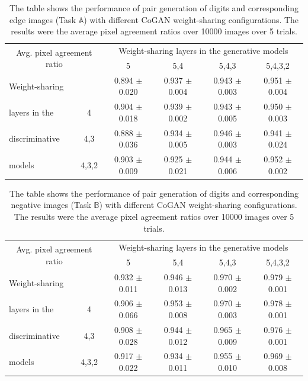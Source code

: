 \begin{table}[thb!]
\centering
{
\caption{The table shows the performance of pair generation of digits and corresponding edge images (Task $\mathbb{A}$) with different CoGAN weight-sharing configurations. The results were the average pixel agreement ratios over 10000 images over 5 trials.}
\label{tbl::weight_sharing_analysis_A} 
\begin{tabular}{lc|cccc}
\hline
\multicolumn{2}{c|}{\multirow{2}{*}{Avg. pixel agreement ratio}} & \multicolumn{4}{c}{Weight-sharing layers in the generative models}\\
\multicolumn{2}{c|}{}   & 5 & 5,4 & 5,4,3 & 5,4,3,2\\
\hline
Weight-sharing &       & 0.894 $\pm$ 0.020	& 0.937 $\pm$ 0.004 &	0.943 $\pm$ 0.003 &	0.951 $\pm$ 0.004 \\
layers in the  & 4     & 0.904 $\pm$	0.018 & 0.939 $\pm$ 0.002 &	0.943 $\pm$ 0.005 &	0.950 $\pm$ 0.003 \\
discriminative & 4,3   & 0.888 $\pm$	0.036 & 0.934 $\pm$ 0.005 &	0.946 $\pm$ 0.003 &	0.941 $\pm$ 0.024 \\
models         & 4,3,2 & 0.903 $\pm$ 0.009 &	0.925 $\pm$ 0.021 &	0.944 $\pm$ 0.006 &	0.952 $\pm$ 0.002 \\
\hline
\end{tabular}}
\end{table}

\begin{table}[thb!]
\centering
{
\caption{The table shows the performance of pair generation of digits and corresponding negative images (Task $\mathbb{B}$) with different CoGAN weight-sharing configurations. The results were the average pixel agreement ratios over 10000 images over 5 trials.}
\label{tbl::weight_sharing_analysis_B} 
\begin{tabular}{lc|cccc}
\hline
\multicolumn{2}{c|}{\multirow{2}{*}{Avg. pixel agreement ratio}} & \multicolumn{4}{c}{Weight-sharing layers in the generative models}\\
\multicolumn{2}{c|}{}   & 5 & 5,4 & 5,4,3 & 5,4,3,2\\
\hline
Weight-sharing &       & 0.932 $\pm$ 0.011 & 0.946 $\pm$ 0.013 &	0.970 $\pm$ 0.002 &	0.979 $\pm$ 0.001 \\
layers in the  & 4     & 0.906 $\pm$ 0.066 & 0.953 $\pm$ 0.008 &	0.970 $\pm$ 0.003 &	0.978 $\pm$ 0.001 \\
discriminative & 4,3   & 0.908 $\pm$ 0.028 & 0.944 $\pm$ 0.012 &	0.965 $\pm$ 0.009 &	0.976 $\pm$ 0.001 \\
models         & 4,3,2 & 0.917 $\pm$ 0.022 & 0.934 $\pm$ 0.011 &	0.955 $\pm$ 0.010 & 0.969 $\pm$ 0.008 \\
\hline
\end{tabular}}
\end{table}


